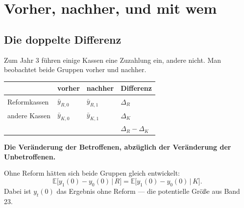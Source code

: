 \chapter{Vorher, nachher, und mit wem}

\section{Die doppelte Differenz}

\begin{merksatz}
Zum Jahr $3$ führen einige Kassen eine Zuzahlung ein, andere nicht. Man beobachtet beide Gruppen vorher und nachher.

\begin{center}
{\small
\renewcommand{\arraystretch}{1.5}
\begin{tabular}{@{}P{2.4cm}P{2.0cm}P{2.0cm}P{2.2cm}@{}}
\toprule
& \textbf{vorher} & \textbf{nachher} & \textbf{Differenz}\\
\midrule
Reformkassen & $\bar y_{R,0}$ & $\bar y_{R,1}$ & $\Delta_R$\\
andere Kassen & $\bar y_{K,0}$ & $\bar y_{K,1}$ & $\Delta_K$\\
\midrule
& & & $\Delta_R - \Delta_K$\\
\bottomrule
\end{tabular}}
\end{center}

\begin{center}
\begin{minipage}{0.9\textwidth}
\textbf{Die Veränderung der Betroffenen, abzüglich der Veränderung der Unbetroffenen.}
\end{minipage}
\end{center}

\begin{center}
\begin{minipage}{0.88\textwidth}
\end{minipage}
\end{center}
\end{merksatz}

\begin{definition}
Ohne Reform hätten sich beide Gruppen gleich entwickelt:
\[ \mathbb{E}\bigl[y_{1}(0) - y_{0}(0)\,\big|\,R\bigr] = \mathbb{E}\bigl[y_{1}(0) - y_{0}(0)\,\big|\,K\bigr] . \]
Dabei ist $y_t(0)$ das Ergebnis ohne Reform --- die potentielle Größe aus Band 23.
\end{definition}

